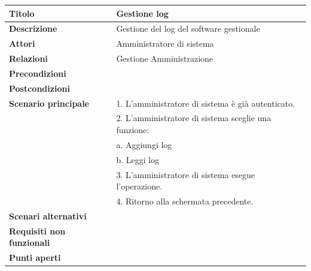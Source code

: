\documentclass[a4paper]{article}
\begin{document}
\begin{center}
\begin{tabularx}{1\textwidth}{|l|X|}
    \hline
	\textbf{Titolo} & Gestione log \\
	\hline
	\textbf{Descrizione} & Gestione del log del software gestionale \\
	\hline
	\textbf{Attori} & Amministratore di sistema \\
	\hline
	\textbf{Relazioni} & Gestione Amministrazione \\
	\hline
	\textbf{Precondizioni} &  \\
	\hline
	\textbf{Postcondizioni} &  \\
	\hline
	\textbf{Scenario principale} & 1. L'amministratore di sistema è già autenticato.\\
	                             & 2. L'amministratore di sistema sceglie una funzione: \\
								 & \quad a. Aggiungi log \\
								 & \quad b. Leggi log \\
								 & 3. L'amministratore di sistema esegue l'operazione.\\
								 & 4. Ritorno alla schermata precedente.\\
	\hline
	\textbf{Scenari alternativi} & \\
	\hline
	\textbf{Requisiti non funzionali} & \\
	\hline
	\textbf{Punti aperti} & \\
	\hline
\end{tabularx}
\end{center}

\end{document}

